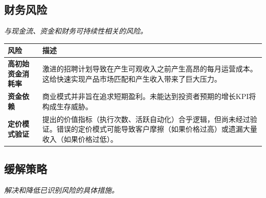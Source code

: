 \documentclass[11pt, a4paper, oneside]{article}
\begin{document}
\newpage
\subsection{财务风险}
\textit{与现金流、资金和财务可持续性相关的风险。}

\begin{table}[H]
\centering
\begin{tabularx}{\textwidth}{@{}lL@{}}
\toprule
\textbf{风险} & \textbf{描述} \\
\midrule
\textbf{高初始资金消耗率} & 激进的招聘计划导致在产生可观收入之前产生高昂的每月运营成本。这给快速实现产品市场匹配和产生收入带来了巨大压力。 \\
\addlinespace
\textbf{资金依赖} & 商业模式并非旨在追求短期盈利。未能达到投资者预期的增长KPI将构成生存威胁。 \\
\addlinespace
\textbf{定价模式验证} & 提出的价值指标（执行次数、活跃自动化）合乎逻辑，但尚未经过验证。错误的定价模式可能导致客户摩擦（如果价格过高）或遗漏大量收入（如果价格过低）。 \\
\bottomrule
\end{tabularx}
\end{table}

\newpage
\subsection{缓解策略}
\textit{解决和降低已识别风险的具体措施。}
\end{document}
